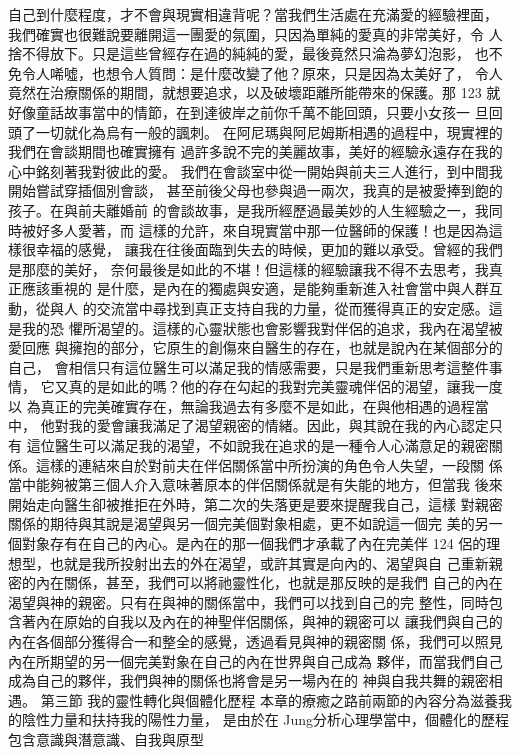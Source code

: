自己到什麼程度，才不會與現實相違背呢？當我們生活處在充滿愛的經驗裡面，
我們確實也很難說要離開這一團愛的氛圍，只因為單純的愛真的非常美好，令
人捨不得放下。只是這些曾經存在過的純純的愛，最後竟然只淪為夢幻泡影，
也不免令人唏噓，也想令人質問：是什麼改變了他？原來，只是因為太美好了，
令人竟然在治療關係的期間，就想要追求，以及破壞距離所能帶來的保護。那
123 
就好像童話故事當中的情節，在到達彼岸之前你千萬不能回頭，只要小女孩一
旦回頭了一切就化為烏有一般的諷刺。 
在阿尼瑪與阿尼姆斯相遇的過程中，現實裡的我們在會談期間也確實擁有
過許多說不完的美麗故事，美好的經驗永遠存在我的心中銘刻著我對彼此的愛。
我們在會談室中從一開始與前夫三人進行，到中間我開始嘗試穿插個別會談，
甚至前後父母也參與過一兩次，我真的是被愛捧到飽的孩子。在與前夫離婚前
的會談故事，是我所經歷過最美妙的人生經驗之一，我同時被好多人愛著，而
這樣的允許，來自現實當中那一位醫師的保護！也是因為這樣很幸福的感覺，
讓我在往後面臨到失去的時候，更加的難以承受。曾經的我們是那麼的美好，
奈何最後是如此的不堪！但這樣的經驗讓我不得不去思考，我真正應該重視的
是什麼，是內在的獨處與安適，是能夠重新進入社會當中與人群互動，從與人
的交流當中尋找到真正支持自我的力量，從而獲得真正的安定感。這是我的恐
懼所渴望的。這樣的心靈狀態也會影響我對伴侶的追求，我內在渴望被愛回應
與擁抱的部分，它原生的創傷來自醫生的存在，也就是說內在某個部分的自己，
會相信只有這位醫生可以滿足我的情感需要，只是我們重新思考這整件事情，
它又真的是如此的嗎？他的存在勾起的我對完美靈魂伴侶的渴望，讓我一度以
為真正的完美確實存在，無論我過去有多麼不是如此，在與他相遇的過程當中，
他對我的愛會讓我滿足了渴望親密的情緒。因此，與其說在我的內心認定只有
這位醫生可以滿足我的渴望，不如說我在追求的是一種令人心滿意足的親密關
係。這樣的連結來自於對前夫在伴侶關係當中所扮演的角色令人失望，一段關
係當中能夠被第三個人介入意味著原本的伴侶關係就是有失能的地方，但當我
後來開始走向醫生卻被推拒在外時，第二次的失落更是要來提醒我自己，這樣
對親密關係的期待與其說是渴望與另一個完美個對象相處，更不如說這一個完
美的另一個對象存有在自己的內心。是內在的那一個我們才承載了內在完美伴
124 
侶的理想型，也就是我所投射出去的外在渴望，或許其實是向內的、渴望與自
己重新親密的內在關係，甚至，我們可以將祂靈性化，也就是那反映的是我們
自己的內在渴望與神的親密。只有在與神的關係當中，我們可以找到自己的完
整性，同時包含著內在原始的自我以及內在的神聖伴侶關係，與神的親密可以
讓我們與自己的內在各個部分獲得合一和整全的感覺，透過看見與神的親密關
係，我們可以照見內在所期望的另一個完美對象在自己的內在世界與自己成為
夥伴，而當我們自己成為自己的夥伴，我們與神的關係也將會是另一場內在的
神與自我共舞的親密相遇。 
第三節 我的靈性轉化與個體化歷程 
本章的療癒之路前兩節的內容分為滋養我的陰性力量和扶持我的陽性力量，
是由於在 Jung分析心理學當中，個體化的歷程包含意識與潛意識、自我與原型
